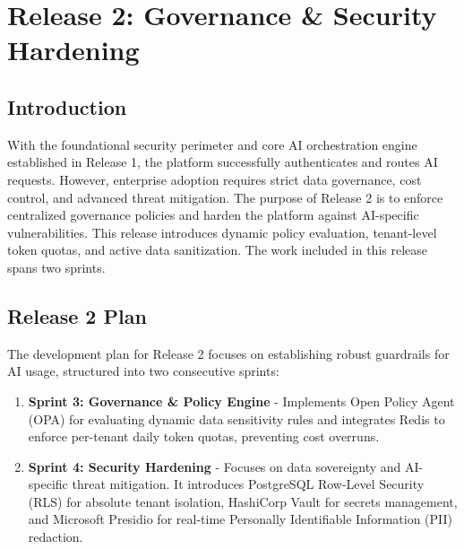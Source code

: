 \chapter{Release 2: Governance \& Security Hardening}

\section{Introduction}

With the foundational security perimeter and core AI orchestration engine established in Release 1, the platform successfully authenticates and routes AI requests. However, enterprise adoption requires strict data governance, cost control, and advanced threat mitigation. The purpose of Release 2 is to enforce centralized governance policies and harden the platform against AI-specific vulnerabilities. This release introduces dynamic policy evaluation, tenant-level token quotas, and active data sanitization. The work included in this release spans two sprints.

\section{Release 2 Plan}

The development plan for Release 2 focuses on establishing robust guardrails for AI usage, structured into two consecutive sprints:

\begin{enumerate}
    \item \textbf{Sprint 3: Governance \& Policy Engine} - Implements Open Policy Agent (OPA) for evaluating dynamic data sensitivity rules and integrates Redis to enforce per-tenant daily token quotas, preventing cost overruns.
    
    \item \textbf{Sprint 4: Security Hardening} - Focuses on data sovereignty and AI-specific threat mitigation. It introduces PostgreSQL Row-Level Security (RLS) for absolute tenant isolation, HashiCorp Vault for secrets management, and Microsoft Presidio for real-time Personally Identifiable Information (PII) redaction.
\end{enumerate}

